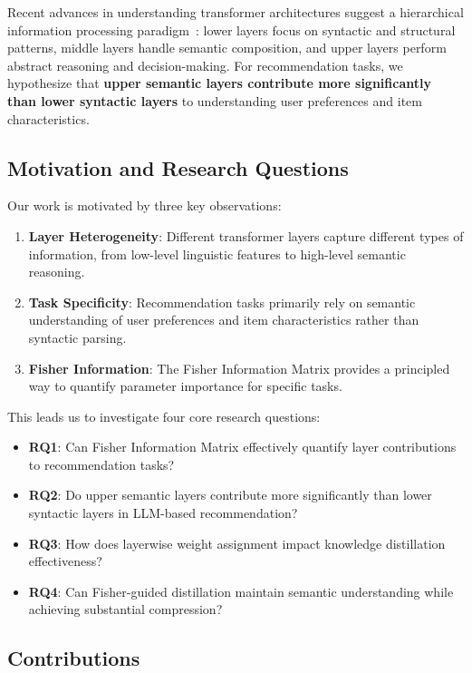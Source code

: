 \documentclass[10pt,conference]{IEEEtran}
\begin{document}
Recent advances in understanding transformer architectures suggest a hierarchical information processing paradigm~\cite{rogers2020primer}: lower layers focus on syntactic and structural patterns, middle layers handle semantic composition, and upper layers perform abstract reasoning and decision-making. For recommendation tasks, we hypothesize that \textbf{upper semantic layers contribute more significantly than lower syntactic layers} to understanding user preferences and item characteristics.

\subsection{Motivation and Research Questions}

Our work is motivated by three key observations:

\begin{enumerate}
    \item \textbf{Layer Heterogeneity}: Different transformer layers capture different types of information, from low-level linguistic features to high-level semantic reasoning.
    \item \textbf{Task Specificity}: Recommendation tasks primarily rely on semantic understanding of user preferences and item characteristics rather than syntactic parsing.
    \item \textbf{Fisher Information}: The Fisher Information Matrix provides a principled way to quantify parameter importance for specific tasks.
\end{enumerate}

This leads us to investigate four core research questions:

\begin{itemize}
    \item \textbf{RQ1}: Can Fisher Information Matrix effectively quantify layer contributions to recommendation tasks?
    \item \textbf{RQ2}: Do upper semantic layers contribute more significantly than lower syntactic layers in LLM-based recommendation?
    \item \textbf{RQ3}: How does layerwise weight assignment impact knowledge distillation effectiveness?
    \item \textbf{RQ4}: Can Fisher-guided distillation maintain semantic understanding while achieving substantial compression?
\end{itemize}

\subsection{Contributions}
\end{document}
